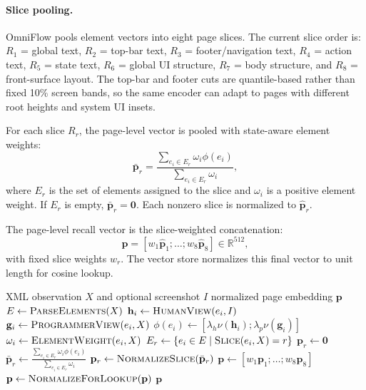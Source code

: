 \paragraph{Slice pooling.}
OmniFlow pools element vectors into eight page slices.  The current slice order
is:
$R_1$ = global text,
$R_2$ = top-bar text,
$R_3$ = footer/navigation text,
$R_4$ = action text,
$R_5$ = state text,
$R_6$ = global UI structure,
$R_7$ = body structure, and
$R_8$ = front-surface layout.
The top-bar and footer cuts are quantile-based rather than fixed 10\% screen
bands, so the same encoder can adapt to pages with different root heights and
system UI insets.

For each slice $R_r$, the page-level vector is pooled with state-aware element
weights:
\[
  \bar{\mathbf{p}}_r =
  \frac{\sum_{e_i \in E_r}\omega_i\phi(e_i)}
       {\sum_{e_i \in E_r}\omega_i},
\]
where $E_r$ is the set of elements assigned to the slice and $\omega_i$ is a
positive element weight.  If $E_r$ is empty, $\bar{\mathbf{p}}_r =
\mathbf{0}$.  Each nonzero slice is normalized to $\hat{\mathbf{p}}_r$.

The page-level recall vector is the slice-weighted concatenation:
\[
  \mathbf{p} =
  [w_1\hat{\mathbf{p}}_1;\ldots;w_8\hat{\mathbf{p}}_8]
  \in \mathbb{R}^{512},
\]
with fixed slice weights $w_r$.  The vector store normalizes this final vector
to unit length for cosine lookup.

\begin{algorithm}[t]
\caption{XML-to-page vector encoding}
\label{alg:xml-page-embedding}
\small
\begin{algorithmic}[1]
\Require XML observation $X$ and optional screenshot $I$
\Ensure normalized page embedding $\mathbf{p}$
\State $E \gets \textsc{ParseElements}(X)$
  \State $\mathbf{h}_i \gets \textsc{HumanView}(e_i, I)$
  \State $\mathbf{g}_i \gets \textsc{ProgrammerView}(e_i, X)$
  \State $\phi(e_i) \gets [\lambda_h\nu(\mathbf{h}_i);\lambda_p\nu(\mathbf{g}_i)]$
  \State $\omega_i \gets \textsc{ElementWeight}(e_i, X)$
\EndFor
{}
  \State $E_r \gets \{e_i \in E \mid \textsc{Slice}(e_i, X)=r\}$
    \State $\mathbf{p}_r \gets \mathbf{0}$
  \Else
    \State $\bar{\mathbf{p}}_r \gets \frac{\sum_{e_i\in E_r}\omega_i\phi(e_i)}{\sum_{e_i\in E_r}\omega_i}$
    \State $\mathbf{p}_r \gets \textsc{NormalizeSlice}(\bar{\mathbf{p}}_r)$
  \EndIf
\EndFor
\State $\mathbf{p} \gets [w_1\mathbf{p}_1;\ldots;w_8\mathbf{p}_8]$
\State $\mathbf{p} \gets \textsc{NormalizeForLookup}(\mathbf{p})$
\State \Return $\mathbf{p}$
\end{algorithmic}
\end{algorithm}


